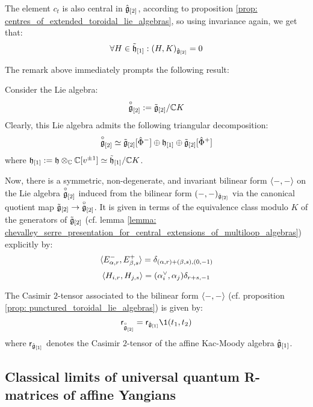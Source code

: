 \begin{remark}
\begin{enumerate}
                The element $c_t$ is also central in $\hat{\mathfrak{g}}_{[2]}$, according to proposition \ref{prop: centres_of_extended_toroidal_lie_algebras}, so using invariance again, we get that:
                    $$\forall H \in \tilde{\mathfrak{h}}_{[1]}: (H, K)_{\hat{\mathfrak{g}}_{[2]}} = 0$$
            \end{enumerate}
        \end{remark}
        The remark above immediately prompts the following result:
        \begin{proposition} \label{prop: punctured_toroidal_lie_algebras}
            Consider the Lie algebra:
                $$\overset{\circ}{\mathfrak{g}}_{[2]} := \tilde{\mathfrak{g}}_{[2]}/\mathbb{C} K$$
            Clearly, this Lie algebra admits the following triangular decomposition:
                $$\overset{\circ}{\mathfrak{g}}_{[2]} \simeq \tilde{\mathfrak{g}}_{[2]}[\hat{\Phi}^-] \oplus \mathfrak{h}_{[1]} \oplus \tilde{\mathfrak{g}}_{[2]}[\hat{\Phi}^+]$$
            where $\h_{[1]} := \h \tensor_{\bbC} \bbC[v^{\pm 1}] \cong \tilde{\h}_{[1]}/\bbC K$.
        
            Now, there is a symmetric, non-degenerate, and invariant bilinear form $\langle-, -\rangle$ on the Lie algebra $\overset{\circ}{\mathfrak{g}}_{[2]}$ induced from the bilinear form $(-, -)_{\hat{\mathfrak{g}}_{[2]}}$ via the canonical quotient map $\tilde{\mathfrak{g}}_{[2]} \to \overset{\circ}{\mathfrak{g}}_{[2]}$. It is given in terms of the equivalence class modulo $K$ of the  generators of $\tilde{\mathfrak{g}}_{[2]}$ (cf. lemma \ref{lemma: chevalley_serre_presentation_for_central_extensions_of_multiloop_algebras}) explicitly by:
                $$\langle E_{\alpha, r}^-, E_{\beta, s}^+ \rangle = \delta_{(\alpha, r) + (\beta, s), (0, -1)}$$
                $$\langle H_{i, r}, H_{j, s} \rangle = (\alpha_i^{\vee}, \alpha_j) \delta_{r + s, -1}$$
        \end{proposition}
        \begin{corollary}
            The Casimir $2$-tensor associated to the bilinear form $\langle-, -\rangle$ (cf. proposition \ref{prop: punctured_toroidal_lie_algebras}) is given by:
                $$\sfr_{\punc{\g}_{[2]}} = \sfr_{\hat{\g}_{[1]}} \1(t_1, t_2)$$
            where $\mathsf{r}_{\hat{\mathfrak{g}}_{[1]}}$ denotes the Casimir $2$-tensor of the affine Kac-Moody algebra $\hat{\mathfrak{g}}_{[1]}$.
        \end{corollary}

    \subsection{Classical limits of universal quantum R-matrices of affine Yangians}